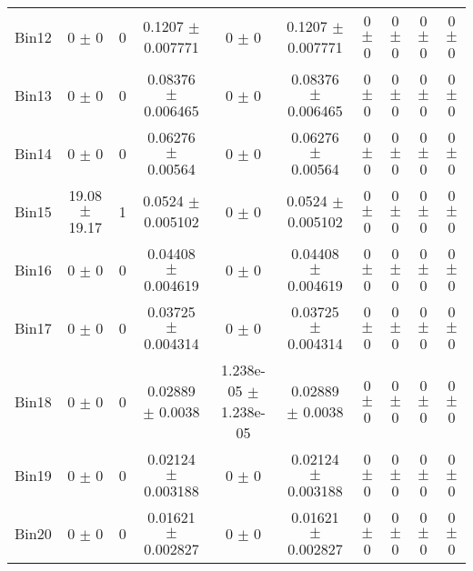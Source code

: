 \begin{tabular}{@{\extracolsep{4pt}}lccccccccc@{}}
     Bin12 & 0 $\pm$ 0 & 0 & 0.1207 $\pm$ 0.007771 & 0 $\pm$ 0 & 0.1207 $\pm$ 0.007771 & 0 $\pm$ 0 & 0 $\pm$ 0 & 0 $\pm$ 0 & 0 $\pm$ 0 \\ 
     Bin13 & 0 $\pm$ 0 & 0 & 0.08376 $\pm$ 0.006465 & 0 $\pm$ 0 & 0.08376 $\pm$ 0.006465 & 0 $\pm$ 0 & 0 $\pm$ 0 & 0 $\pm$ 0 & 0 $\pm$ 0 \\ 
     Bin14 & 0 $\pm$ 0 & 0 & 0.06276 $\pm$ 0.00564 & 0 $\pm$ 0 & 0.06276 $\pm$ 0.00564 & 0 $\pm$ 0 & 0 $\pm$ 0 & 0 $\pm$ 0 & 0 $\pm$ 0 \\ 
     Bin15 & 19.08 $\pm$ 19.17 & 1 & 0.0524 $\pm$ 0.005102 & 0 $\pm$ 0 & 0.0524 $\pm$ 0.005102 & 0 $\pm$ 0 & 0 $\pm$ 0 & 0 $\pm$ 0 & 0 $\pm$ 0 \\ 
     Bin16 & 0 $\pm$ 0 & 0 & 0.04408 $\pm$ 0.004619 & 0 $\pm$ 0 & 0.04408 $\pm$ 0.004619 & 0 $\pm$ 0 & 0 $\pm$ 0 & 0 $\pm$ 0 & 0 $\pm$ 0 \\ 
     Bin17 & 0 $\pm$ 0 & 0 & 0.03725 $\pm$ 0.004314 & 0 $\pm$ 0 & 0.03725 $\pm$ 0.004314 & 0 $\pm$ 0 & 0 $\pm$ 0 & 0 $\pm$ 0 & 0 $\pm$ 0 \\ 
     Bin18 & 0 $\pm$ 0 & 0 & 0.02889 $\pm$ 0.0038 & 1.238e-05 $\pm$ 1.238e-05 & 0.02889 $\pm$ 0.0038 & 0 $\pm$ 0 & 0 $\pm$ 0 & 0 $\pm$ 0 & 0 $\pm$ 0 \\ 
     Bin19 & 0 $\pm$ 0 & 0 & 0.02124 $\pm$ 0.003188 & 0 $\pm$ 0 & 0.02124 $\pm$ 0.003188 & 0 $\pm$ 0 & 0 $\pm$ 0 & 0 $\pm$ 0 & 0 $\pm$ 0 \\ 
     Bin20 & 0 $\pm$ 0 & 0 & 0.01621 $\pm$ 0.002827 & 0 $\pm$ 0 & 0.01621 $\pm$ 0.002827 & 0 $\pm$ 0 & 0 $\pm$ 0 & 0 $\pm$ 0 & 0 $\pm$ 0 \\ 
\hline\hline
  \end{tabular}
